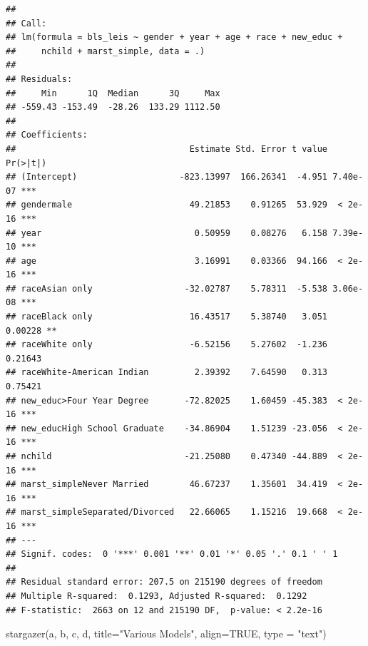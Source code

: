 \documentclass[
]{article}
\newenvironment{Shaded}{\begin{snugshade}}{\end{snugshade}}
\newcommand{\AttributeTok}[1]{\textcolor[rgb]{0.77,0.63,0.00}{#1}}
\newcommand{\ConstantTok}[1]{\textcolor[rgb]{0.00,0.00,0.00}{#1}}
\newcommand{\FunctionTok}[1]{\textcolor[rgb]{0.00,0.00,0.00}{#1}}
\newcommand{\NormalTok}[1]{#1}
\newcommand{\StringTok}[1]{\textcolor[rgb]{0.31,0.60,0.02}{#1}}
\begin{document}
\begin{verbatim}
## 
## Call:
## lm(formula = bls_leis ~ gender + year + age + race + new_educ + 
##     nchild + marst_simple, data = .)
## 
## Residuals:
##     Min      1Q  Median      3Q     Max 
## -559.43 -153.49  -28.26  133.29 1112.50 
## 
## Coefficients:
##                                  Estimate Std. Error t value Pr(>|t|)    
## (Intercept)                    -823.13997  166.26341  -4.951 7.40e-07 ***
## gendermale                       49.21853    0.91265  53.929  < 2e-16 ***
## year                              0.50959    0.08276   6.158 7.39e-10 ***
## age                               3.16991    0.03366  94.166  < 2e-16 ***
## raceAsian only                  -32.02787    5.78311  -5.538 3.06e-08 ***
## raceBlack only                   16.43517    5.38740   3.051  0.00228 ** 
## raceWhite only                   -6.52156    5.27602  -1.236  0.21643    
## raceWhite-American Indian         2.39392    7.64590   0.313  0.75421    
## new_educ>Four Year Degree       -72.82025    1.60459 -45.383  < 2e-16 ***
## new_educHigh School Graduate    -34.86904    1.51239 -23.056  < 2e-16 ***
## nchild                          -21.25080    0.47340 -44.889  < 2e-16 ***
## marst_simpleNever Married        46.67237    1.35601  34.419  < 2e-16 ***
## marst_simpleSeparated/Divorced   22.66065    1.15216  19.668  < 2e-16 ***
## ---
## Signif. codes:  0 '***' 0.001 '**' 0.01 '*' 0.05 '.' 0.1 ' ' 1
## 
## Residual standard error: 207.5 on 215190 degrees of freedom
## Multiple R-squared:  0.1293, Adjusted R-squared:  0.1292 
## F-statistic:  2663 on 12 and 215190 DF,  p-value: < 2.2e-16
\end{verbatim}

\begin{Shaded}
\begin{Highlighting}[]
\FunctionTok{stargazer}\NormalTok{(a, b, c, d, }\AttributeTok{title=}\StringTok{"Various Models"}\NormalTok{, }\AttributeTok{align=}\ConstantTok{TRUE}\NormalTok{, }\AttributeTok{type =} \StringTok{"text"}\NormalTok{)}
\end{Highlighting}
\end{Shaded}
\end{document}
